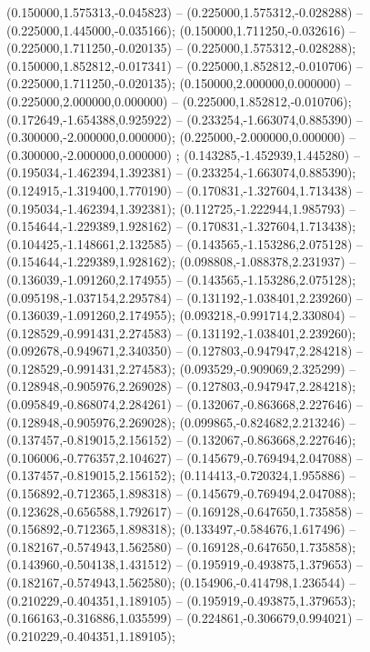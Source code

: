  (0.150000,1.575313,-0.045823) -- (0.225000,1.575312,-0.028288) -- (0.225000,1.445000,-0.035166);
 (0.150000,1.711250,-0.032616) -- (0.225000,1.711250,-0.020135) -- (0.225000,1.575312,-0.028288);
 (0.150000,1.852812,-0.017341) -- (0.225000,1.852812,-0.010706) -- (0.225000,1.711250,-0.020135);
 (0.150000,2.000000,0.000000) -- (0.225000,2.000000,0.000000) -- (0.225000,1.852812,-0.010706);
 (0.172649,-1.654388,0.925922) -- (0.233254,-1.663074,0.885390) -- (0.300000,-2.000000,0.000000);
 (0.225000,-2.000000,0.000000) -- (0.300000,-2.000000,0.000000) ;
 (0.143285,-1.452939,1.445280) -- (0.195034,-1.462394,1.392381) -- (0.233254,-1.663074,0.885390);
 (0.124915,-1.319400,1.770190) -- (0.170831,-1.327604,1.713438) -- (0.195034,-1.462394,1.392381);
 (0.112725,-1.222944,1.985793) -- (0.154644,-1.229389,1.928162) -- (0.170831,-1.327604,1.713438);
 (0.104425,-1.148661,2.132585) -- (0.143565,-1.153286,2.075128) -- (0.154644,-1.229389,1.928162);
 (0.098808,-1.088378,2.231937) -- (0.136039,-1.091260,2.174955) -- (0.143565,-1.153286,2.075128);
 (0.095198,-1.037154,2.295784) -- (0.131192,-1.038401,2.239260) -- (0.136039,-1.091260,2.174955);
 (0.093218,-0.991714,2.330804) -- (0.128529,-0.991431,2.274583) -- (0.131192,-1.038401,2.239260);
 (0.092678,-0.949671,2.340350) -- (0.127803,-0.947947,2.284218) -- (0.128529,-0.991431,2.274583);
 (0.093529,-0.909069,2.325299) -- (0.128948,-0.905976,2.269028) -- (0.127803,-0.947947,2.284218);
 (0.095849,-0.868074,2.284261) -- (0.132067,-0.863668,2.227646) -- (0.128948,-0.905976,2.269028);
 (0.099865,-0.824682,2.213246) -- (0.137457,-0.819015,2.156152) -- (0.132067,-0.863668,2.227646);
 (0.106006,-0.776357,2.104627) -- (0.145679,-0.769494,2.047088) -- (0.137457,-0.819015,2.156152);
 (0.114413,-0.720324,1.955886) -- (0.156892,-0.712365,1.898318) -- (0.145679,-0.769494,2.047088);
 (0.123628,-0.656588,1.792617) -- (0.169128,-0.647650,1.735858) -- (0.156892,-0.712365,1.898318);
 (0.133497,-0.584676,1.617496) -- (0.182167,-0.574943,1.562580) -- (0.169128,-0.647650,1.735858);
 (0.143960,-0.504138,1.431512) -- (0.195919,-0.493875,1.379653) -- (0.182167,-0.574943,1.562580);
 (0.154906,-0.414798,1.236544) -- (0.210229,-0.404351,1.189105) -- (0.195919,-0.493875,1.379653);
 (0.166163,-0.316886,1.035599) -- (0.224861,-0.306679,0.994021) -- (0.210229,-0.404351,1.189105);

